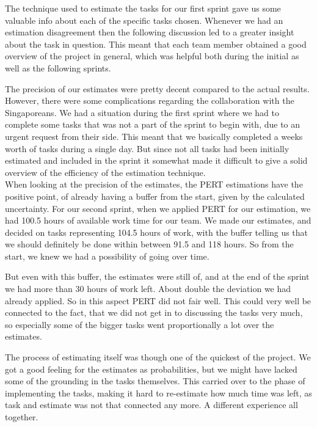 The technique used to estimate the tasks for our first sprint gave us some valuable info about each of the specific tasks chosen. Whenever we had an estimation disagreement then the following discussion led to a greater insight about the task in question. This meant that each team member obtained a good overview of the project in general, which was helpful both during the initial as well as the following sprints.

The precision of our estimates were pretty decent compared to the actual results. However, there were some complications regarding the collaboration with the Singaporeans. We had a situation during the first sprint where we had to complete some tasks that was not a part of the sprint to begin with, due to an urgent request from their side. This meant that we basically completed a weeks worth of tasks during a single day. But since not all tasks had been initially estimated and included in the sprint it somewhat made it difficult to give a solid overview of the efficiency of the estimation technique. \\

When looking at the precision of the estimates, the PERT estimations have the positive point, of already having a buffer from the start, given by the calculated uncertainty. For our second sprint, when we applied PERT for our estimation, we had 100.5 hours of available work time for our team. We made our estimates, and decided on tasks representing 104.5 hours of work, with the buffer telling us that we should definitely be done within between 91.5 and 118 hours. So from the start, we knew we had a possibility of going over time. 

But even with this buffer, the estimates were still of, and at the end of the sprint we had more than 30 hours of work left. About double the deviation we had already applied. So in this aspect PERT did not fair well. This could very well be connected to the fact, that we did not get in to discussing the tasks very much, so especially some of the bigger tasks went proportionally a lot over the estimates. 

The process of estimating itself was though one of the quickest of the project. We got a good feeling for the estimates as probabilities, but we might have lacked some of the grounding in the tasks themselves. This carried over to the phase of implementing the tasks, making it hard to re-estimate how much time was left, as task and estimate was not that connected any more. A different experience all together. \\

